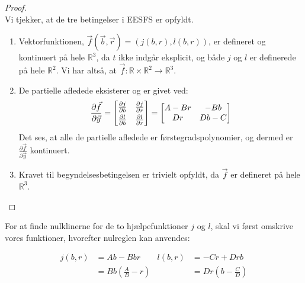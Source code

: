 \begin{proof}\\
Vi tjekker, at de tre betingelser i EESFS er opfyldt.\\ \hfill \break
\begin{enumerate}
    \item Vektorfunktionen, $\vec{f}(\vec{b},\vec{r})=(j(b,r),l(b,r))$, er defineret og kontinuert på hele $\mathbb{R}^3$, da $t$ ikke indgår eksplicit, og både $j$ og $l$ er definerede på hele $\mathbb{R}^2$. Vi har altså, at $\vec{f}\colon \mathbb{R}\times \mathbb{R}^2\to\mathbb{R}^3$.
    \item De partielle afledede eksisterer og er givet ved:
    \begin{equation*}
    \frac{\partial\vec{f}}{\partial \vec{y}}=
    \begin{bmatrix}
    \frac{\partial j}{\partial b} & \frac{\partial j}{\partial r}\vspace{1mm}\\
    \frac{\partial l}{\partial b} & \frac{\partial l}{\partial r}
    \end{bmatrix}
    =
    \begin{bmatrix}
    A-Br & -Bb\\
    Dr & Db-C
    \end{bmatrix}
    \end{equation*}
    Det ses, at alle de partielle afledede er førstegradspolynomier, og dermed er $\frac{\partial\vec{f}}{\partial \vec{y}}$ kontinuert.
    \item Kravet til begyndelsesbetingelsen er trivielt opfyldt, da $\vec{f}$ er defineret på hele $\mathbb{R}^3$.
\end{enumerate}
\end{proof}

\hfill \break

For at finde nulklinerne for de to hjælpefunktioner $j$ og $l$, skal vi først omskrive vores funktioner, hvorefter nulreglen kan anvendes:

\begin{align*}
    j(b,r)&=Ab-Bbr  &   l(b,r)&=-Cr+Drb\\
    &=Bb\left(\frac{A}{B}-r\right)  &   &=Dr\left(b-\frac{C}{D}\right)
\end{align*}

